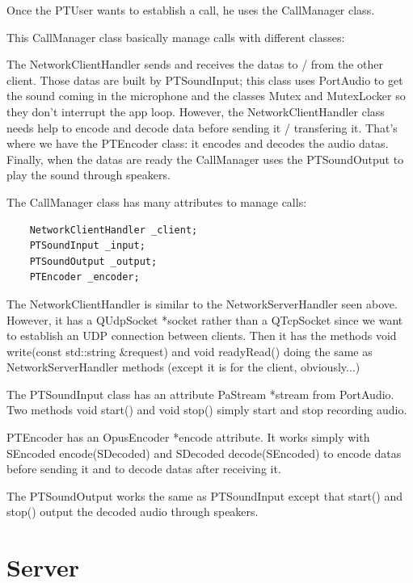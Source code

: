 \documentclass{article}
\begin{document}
 \bigskip
 Once the PTUser wants to establish a call, he uses the CallManager class.

 This CallManager class basically manage calls with different classes:

 \bigskip
 The NetworkClientHandler sends and receives the datas to / from the other client.
 Those datas are built by PTSoundInput; this class uses PortAudio to get the sound coming in the microphone and the classes Mutex and MutexLocker so they don't interrupt the app loop.
 However, the NetworkClientHandler class needs help to encode and decode data before sending it / transfering it.
 That's where we have the PTEncoder class: it encodes and decodes the audio datas.
 Finally, when the datas are ready the CallManager uses the PTSoundOutput to play the sound through speakers.
 \bigskip

 The CallManager class has many attributes to manage calls:

  \begin{lstlisting}
    NetworkClientHandler _client;
    PTSoundInput _input;
    PTSoundOutput _output;
    PTEncoder _encoder;
  \end{lstlisting}

  \bigskip
  The NetworkClientHandler is similar to the NetworkServerHandler seen above. However, it has a QUdpSocket *socket rather than a QTcpSocket since we want to establish an UDP connection between clients.
  Then it has the methods void write(const std::string &request) and void readyRead() doing the same as NetworkServerHandler methods (except it is for the client, obviously...)
  \bigskip

  The PTSoundInput class has an attribute PaStream *stream from PortAudio.
  Two methods void start() and void stop() simply start and stop recording audio.

  \bigskip

  PTEncoder has an OpusEncoder *encode attribute.
  It works simply with SEncoded encode(SDecoded) and SDecoded decode(SEncoded) to encode datas before sending it and to decode datas after receiving it.

  \bigskip

  The PTSoundOutput works the same as PTSoundInput except that start() and stop() output the decoded audio through speakers.

  \newpage
  \section{Server}
\end{document}
